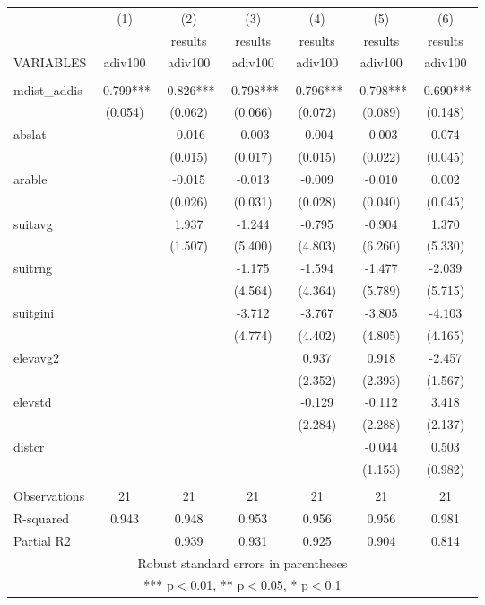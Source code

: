 \documentclass[]{article}
\begin{document}
\begin{tabular}{lcccccc} \hline
 & (1) & (2) & (3) & (4) & (5) & (6) \\
 &  & results & results & results & results & results \\
VARIABLES & adiv100 & adiv100 & adiv100 & adiv100 & adiv100 & adiv100 \\ \hline
 &  &  &  &  &  &  \\
mdist\_addis & -0.799*** & -0.826*** & -0.798*** & -0.796*** & -0.798*** & -0.690*** \\
 & (0.054) & (0.062) & (0.066) & (0.072) & (0.089) & (0.148) \\
abslat &  & -0.016 & -0.003 & -0.004 & -0.003 & 0.074 \\
 &  & (0.015) & (0.017) & (0.015) & (0.022) & (0.045) \\
arable &  & -0.015 & -0.013 & -0.009 & -0.010 & 0.002 \\
 &  & (0.026) & (0.031) & (0.028) & (0.040) & (0.045) \\
suitavg &  & 1.937 & -1.244 & -0.795 & -0.904 & 1.370 \\
 &  & (1.507) & (5.400) & (4.803) & (6.260) & (5.330) \\
suitrng &  &  & -1.175 & -1.594 & -1.477 & -2.039 \\
 &  &  & (4.564) & (4.364) & (5.789) & (5.715) \\
suitgini &  &  & -3.712 & -3.767 & -3.805 & -4.103 \\
 &  &  & (4.774) & (4.402) & (4.805) & (4.165) \\
elevavg2 &  &  &  & 0.937 & 0.918 & -2.457 \\
 &  &  &  & (2.352) & (2.393) & (1.567) \\
elevstd &  &  &  & -0.129 & -0.112 & 3.418 \\
 &  &  &  & (2.284) & (2.288) & (2.137) \\
distcr &  &  &  &  & -0.044 & 0.503 \\
 &  &  &  &  & (1.153) & (0.982) \\
 &  &  &  &  &  &  \\
Observations & 21 & 21 & 21 & 21 & 21 & 21 \\
R-squared & 0.943 & 0.948 & 0.953 & 0.956 & 0.956 & 0.981 \\
 Partial R2 &  & 0.939 & 0.931 & 0.925 & 0.904 & 0.814 \\ \hline
\multicolumn{7}{c}{ Robust standard errors in parentheses} \\
\multicolumn{7}{c}{ *** p$<$0.01, ** p$<$0.05, * p$<$0.1} \\
\end{tabular}
\end{document}
